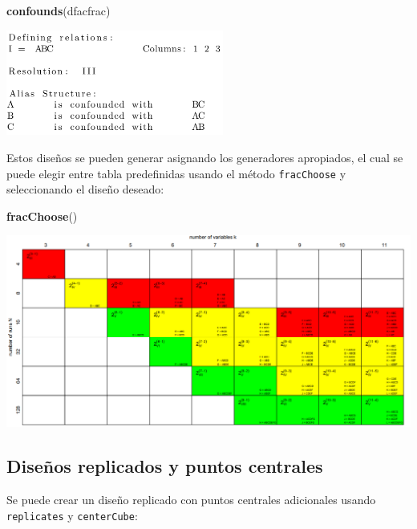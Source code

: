 \documentclass[
]{book}
\newenvironment{Shaded}{\begin{snugshade}}{\end{snugshade}}
\newcommand{\FunctionTok}[1]{\textcolor[rgb]{0.13,0.29,0.53}{\textbf{#1}}}
\newcommand{\NormalTok}[1]{#1}
\begin{document}
\begin{Shaded}
\begin{Highlighting}[]
\FunctionTok{confounds}\NormalTok{(dfacfrac)}
\end{Highlighting}
\end{Shaded}

\includegraphics[width=2.8125in,height=\textheight]{graficos/confoundsdf.png}

Estos diseños se pueden generar asignando los generadores apropiados, el cual se puede elegir entre tabla predefinidas usando el método \texttt{fracChoose} y seleccionando el diseño deseado:

\begin{Shaded}
\begin{Highlighting}[]
\FunctionTok{fracChoose}\NormalTok{()}
\end{Highlighting}
\end{Shaded}

\includegraphics[width=7.29167in,height=\textheight]{graficos/dfchoose.png}

\hypertarget{diseuxf1os-replicados-y-puntos-centrales}{%
\subsection{Diseños replicados y puntos centrales}\label{diseuxf1os-replicados-y-puntos-centrales}}

Se puede crear un diseño replicado con puntos centrales adicionales usando \texttt{replicates} y \texttt{centerCube}:
\end{document}
